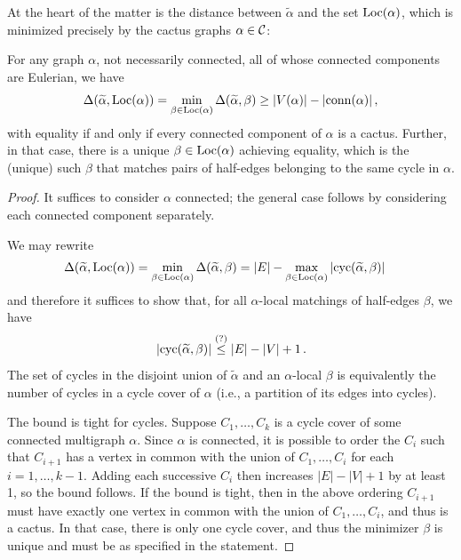 At the heart of the matter is the distance between $\widetilde{\alpha}$ and the set $\mathrm{Loc}(\alpha)$, which is minimized precisely by the cactus graphs $\alpha\in{\cal C}$:
\begin{proposition}
    \label{prop:cactus-loc-dist}
    For any graph $\alpha$, not necessarily connected, all of whose connected components are Eulerian, we have
    \[ \Delta(\widetilde{\alpha}, \mathrm{Loc}(\alpha)) = \min_{\beta \in \mathrm{Loc}(\alpha)} \Delta(\widetilde{\alpha}, \beta) \geq |V(\alpha)| - |\mathrm{conn}(\alpha)|\,, \]
    with equality if and only if every connected component of $\alpha$ is a cactus.
    Further, in that case, there is a unique $\beta \in \mathrm{Loc}(\alpha)$ achieving equality, which is the (unique) such $\beta$ that matches pairs of half-edges belonging to the same cycle in $\alpha$.
\end{proposition}
\begin{proof}
    It suffices to consider $\alpha$ connected; the general case follows by considering each connected component separately.

    We may rewrite
    \begin{align*}
    \Delta(\widetilde{\alpha}, \mathrm{Loc}(\alpha)) 
    &= \min_{\beta \in \mathrm{Loc}(\alpha)} \Delta(\widetilde{\alpha}, \beta) = |E| - \max_{\beta \in \mathrm{Loc}(\alpha)} |\mathrm{cyc}(\widetilde{\alpha}, \beta)|
    \end{align*}
    and therefore it suffices to show that, for all $\alpha$-local matchings of half-edges $\beta$, we have
    \[ |\mathrm{cyc}(\widetilde{\alpha}, \beta)| \stackrel{\text{(?)}}{\leq} |E| - |V| + 1\,. \]
    The set of cycles in the disjoint union of $\widetilde{\alpha}$ and an $\alpha$-local $\beta$ is equivalently the number of cycles in a cycle cover of $\alpha$ (i.e., a partition of its edges into cycles).

    The bound is tight for cycles.
    Suppose $C_1, \dots, C_k$ is a cycle cover of some connected multigraph $\alpha$.
    Since $\alpha$ is connected, it is possible to order the $C_i$ such that $C_{i + 1}$ has a vertex in common with the union of $C_1, \dots, C_i$ for each $i = 1, \dots, k - 1$.
    Adding each successive $C_i$ then increases $|E| - |V| + 1$ by at least 1, so the bound follows.
    If the bound is tight, then in the above ordering $C_{i + 1}$ must have exactly one vertex in common with the union of $C_1, \dots, C_i$, and thus is a cactus.
    In that case, there is only one cycle cover, and thus the minimizer $\beta$ is unique and must be as specified in the statement.
\end{proof}

